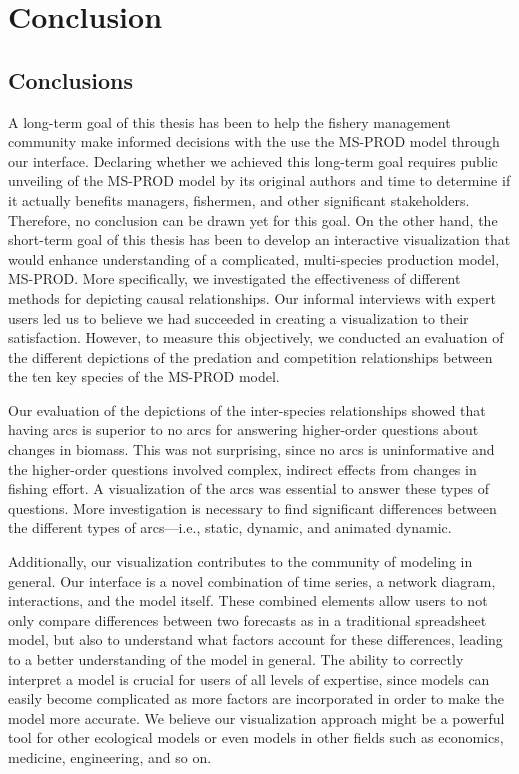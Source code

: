\chapter{Conclusion}

\section{Conclusions}

A long-term goal of this thesis has been to help the fishery management community make informed decisions with the use the MS-PROD model through our interface.  Declaring whether we achieved this long-term goal requires public unveiling of the MS-PROD model by its original authors and time to determine if it actually benefits managers, fishermen, and other significant stakeholders.  Therefore, no conclusion can be drawn yet for this goal.  On the other hand, the short-term goal of this thesis has been to develop an interactive visualization that would enhance understanding of a complicated, multi-species production model, MS-PROD.  More specifically, we investigated the effectiveness of different methods for depicting causal relationships.  Our informal interviews with expert users led us to believe we had succeeded in creating a visualization to their satisfaction.  However, to measure this objectively, we conducted an evaluation of the different depictions of the predation and competition relationships between the ten key species of the MS-PROD model.

Our evaluation of the depictions of the inter-species relationships showed that having arcs is superior to no arcs for answering higher-order questions about changes in biomass.  This was not surprising, since no arcs is uninformative and the higher-order questions involved complex, indirect effects from changes in fishing effort.  A visualization of the arcs was essential to answer these types of questions.  More investigation is necessary to find significant differences between the different types of arcs---i.e., static, dynamic, and animated dynamic. 

Additionally, our visualization contributes to the community of modeling in general.  Our interface is a novel combination of time series, a network diagram, interactions, and the model itself.  These combined elements allow users to not only compare differences between two forecasts as in a traditional spreadsheet model, but also to understand what factors account for these differences, leading to a better understanding of the model in general.  The ability to correctly interpret a model is crucial for users of all levels of expertise, since models can easily become complicated as more factors are incorporated in order to make the model more accurate.  We believe our visualization approach might be a powerful tool for other ecological models or even models in other fields such as economics, medicine, engineering, and so on.

